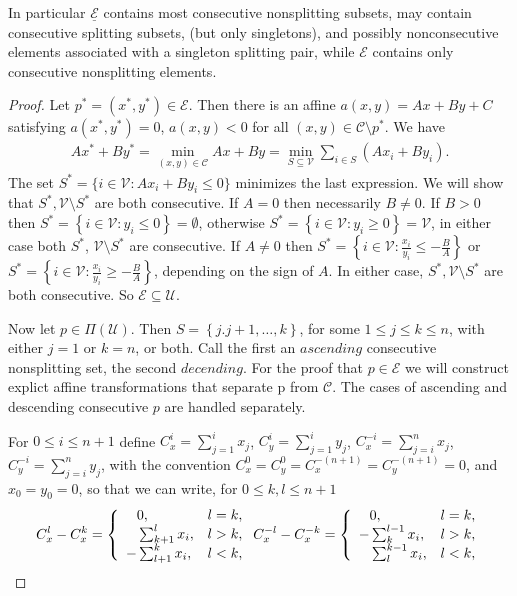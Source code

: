 \documentclass{article}
\theoremstyle{case}
\begin{document}
In particular $\underline{\mathcal{E}}$ contains most consecutive nonsplitting subsets, may contain consecutive splitting subsets, (but only singletons), and possibly nonconsecutive elements associated with a singleton splitting pair, while $\mathcal{E}$ contains only consecutive nonsplitting elements.
\begin{proof}
Let $p ^* = (x^*, y^*) \in \mathcal{E}$. Then there is an affine $a\left(x,y\right) = Ax + By + C$ satisfying $a(x^*, y^*) = 0$, $a(x,y) < 0$ for all $(x,y) \in \mathcal{C} \setminus p^*$.  We have
\begin{align}
Ax^* + By^* = \min_{(x,y) \in \mathcal{C}} Ax + By = \min_{S \subseteq \mathcal{V}} \sum_{i \in S} (Ax_i + By_i).
\end{align}
The set $S^* = \{ i \in \mathcal{V}: Ax_i + By_i \leq 0 \}$ minimizes the last expression. We will show that $S^*, \mathcal{V}\setminus S^*$ are both consecutive. If $A = 0$ then necessarily $B \neq 0$. If $B > 0$ then $S^* =\left\lbrace i \in \mathcal{V} \colon y_i \leq 0 \right\rbrace = \emptyset$, otherwise $S^* = \left\lbrace i \in \mathcal{V}  \colon y_i \geq 0 \right\rbrace = \mathcal{V}$, in either case both $S^*$, $\mathcal{V}\setminus S^*$ are consecutive. If $ A \neq 0$ then $S^* = \left\lbrace i \in \mathcal{V} \colon \frac{x_i}{y_i} \leq -\frac{B}{A} \right\rbrace$ or $S^* = \left\lbrace i \in \mathcal{V} \colon \frac{x_i}{y_i} \geq -\frac{B}{A} \right\rbrace$, depending on the sign of $A$. In either case, $S^*, \mathcal{V}\setminus S^*$ are both consecutive. So $\mathcal{E} \subseteq \mathcal{U}$.

Now let $p \in \Pi\left( \mathcal{U}\right)$. Then $S = \left\lbrace j.j+1, \dots, k \right\rbrace$, for some $1 \leq j \leq k \leq n$, with either $j = 1$ or $k = n$, or both. Call the first an $\textit{ascending}$ consecutive nonsplitting set, the second $\textit{decending}$. For the proof that $p \in \mathcal{E}$ we will construct explict affine transformations that separate p from $\mathcal{C}$. The cases of ascending and descending consecutive $p$ are handled separately.

For $0 \leq i \leq n+1$ define $C_x^i = \sum_{j=1}^i x_j$, $C_y^i = \sum_{j=1}^i y_j$, $C_x^{-i} = \sum_{j=i}^n x_j$, $C_y^{-i} = \sum_{j=i}^n y_j$, with the convention $C_x^0 = C_y^0 = C_x^{-(n+1)} = C_y^{-(n+1)} = 0$, and $x_0 = y_0 = 0$, so that we can write, for $0  \leq k,l \leq n+1$
\begin{align*}
C_x^l - C_x^k = \left\{
\begin{array}{ll}
  \hphantom{-}0, & l = k, \\
  \hphantom{-}\sum_{k+1}^l x_i, & l > k, \\
  -\sum_{l+1}^k x_i, & l < k, \\
\end{array} 
\right.    
C_x^{-l} - C_x^{-k} = \left\{
\begin{array}{ll}
  \hphantom{-}0, & l = k, \\
  -\sum_k^{l-1} x_i, & l > k, \\
  \hphantom{-}\sum_l^{k-1} x_i, & l < k, \\
\end{array} 
\right. 
\end{align*}


\end{proof}
\end{document}
